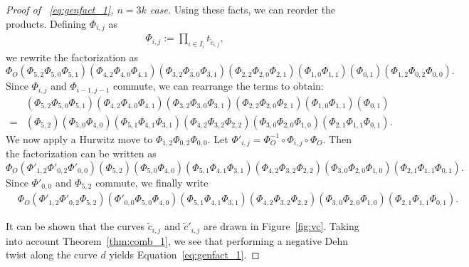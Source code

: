 \documentclass[10pt,a4paper,reqno]{amsart}
\theoremstyle{definition}
\numberwithin{equation}{section}
\numberwithin{figure}{section}
\begin{document}
\begin{proof}[Proof of ~\eqref{eq:genfact_1}, $n=3k$ case]
Using these facts, we can reorder the products. Defining $\Phi_{i,j}$ as 
\begin{align}
\Phi_{i,j}:=\prod_{\iota\in I_i}t_{\tilde{c}_{\iota,j}}, 
\end{align}
we rewrite the factorization as
\[ \Phi_O  (\Phi_{5,2}\Phi_{5,0}\Phi_{5,1})(\Phi_{4,2}\Phi_{4,0}\Phi_{4,1})(\Phi_{3,2}\Phi_{3,0}\Phi_{3,1})
(\Phi_{2,2}\Phi_{2,0}\Phi_{2,1})(\Phi_{1,0}\Phi_{1,1})(\Phi_{0,1})(\Phi_{1,2}\Phi_{0,2}\Phi_{0,0}). \]
Since $\Phi_{i,j}$ and $\Phi_{i-1, j-1}$ commute, we can rearrange the terms to obtain:
\begin{align*}
&(\Phi_{5,2}\Phi_{5,0}\Phi_{5,1})(\Phi_{4,2}\Phi_{4,0}\Phi_{4,1})(\Phi_{3,2}\Phi_{3,0}\Phi_{3,1})
(\Phi_{2,2}\Phi_{2,0}\Phi_{2,1})(\Phi_{1,0}\Phi_{1,1})(\Phi_{0,1})\\
=&(\Phi_{5,2})(\Phi_{5,0}\Phi_{4,0})(\Phi_{5,1}\Phi_{4,1}\Phi_{3,1})(\Phi_{4,2}\Phi_{3,2}\Phi_{2,2})
(\Phi_{3,0}\Phi_{2,0}\Phi_{1,0})(\Phi_{2,1}\Phi_{1,1}\Phi_{0,1}).
\end{align*}
We now apply a Hurwitz move to $\Phi_{1,2}\Phi_{0,2}\Phi_{0,0}$.
Let $\Phi'_{i,j}=\Phi_O^{-1}\circ \Phi_{i,j}\circ \Phi_O$.
Then the factorization can be written as
\[\Phi_O (\Phi'_{1,2}\Phi'_{0,2}\Phi'_{0,0})(\Phi_{5,2})(\Phi_{5,0}\Phi_{4,0})(\Phi_{5,1}\Phi_{4,1}\Phi_{3,1})(\Phi_{4,2}\Phi_{3,2}\Phi_{2,2})
(\Phi_{3,0}\Phi_{2,0}\Phi_{1,0})(\Phi_{2,1}\Phi_{1,1}\Phi_{0,1}).\]
Since $\Phi'_{0,0}$ and $\Phi_{5,2}$ commute, we finally write
\begin{align}
&\Phi_O (\Phi'_{1,2}\Phi'_{0,2}\Phi_{5,2})(\Phi'_{0,0}\Phi_{5,0}\Phi_{4,0})(\Phi_{5,1}\Phi_{4,1}\Phi_{3,1})(\Phi_{4,2}\Phi_{3,2}\Phi_{2,2})
(\Phi_{3,0}\Phi_{2,0}\Phi_{1,0})(\Phi_{2,1}\Phi_{1,1}\Phi_{0,1}).
\end{align}

It can be shown that the curves $\tilde{c}_{i,j}$ and $\tilde{c}'_{i,j}$ are drawn in Figure~\ref{fig:vc}.
Taking into account Theorem~\ref{thm:comb_1}, we see that performing a negative Dehn twist along the curve $d$
yields Equation~\eqref{eq:genfact_1}.
\end{proof}

\end{document}
